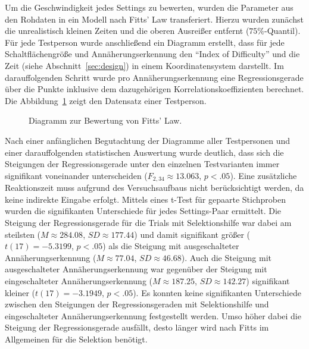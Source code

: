 \documentclass[12pt,numbers=noenddot,parskip,bibliography=totocnumbered,listof=totocnumbered]{scrreprt}
\begin{document}
Um die Geschwindigkeit jedes Settings zu bewerten, wurden die Parameter aus den Rohdaten in ein Modell nach Fitts' Law transferiert. Hierzu wurden zunächst die unrealistisch kleinen Zeiten und die oberen Ausreißer entfernt ($75\%$-Quantil). Für jede Testperson wurde anschließend ein Diagramm erstellt, dass für jede Schaltflächengröße und Annäherungserkennung den "`Index of Difficulty"' und die Zeit (siehe Abschnitt~\ref{sec:design}) in einem Koordinatensystem darstellt. Im darauffolgenden Schritt wurde pro Annäherungserkennung eine Regressionsgerade über die Punkte inklusive dem dazugehörigen Korrelationskoeffizienten berechnet. Die Abbildung~\ref{ergebnistest2fitts} zeigt den Datensatz einer Testperson.
\begin{figure}
\centering
\caption{Diagramm zur Bewertung von Fitts' Law.}
\label{ergebnistest2fitts}
\end{figure}
Nach einer anfänglichen Begutachtung der Diagramme aller Testpersonen und einer darauffolgenden statistischen Auswertung wurde deutlich, dass sich die Steigungen der Regressionsgerade unter den einzelnen Testvarianten immer signifikant voneinander unterscheiden ($F_{2,34}\approx 13.063$, $p < .05$). Eine zusätzliche Reaktionszeit muss aufgrund des Versuchsaufbaus nicht berücksichtigt werden, da keine indirekte Eingabe erfolgt. Mittels eines t-Test für gepaarte Stichproben wurden die signifikanten Unterschiede für jedes Settings-Paar ermittelt. Die Steigung der Regressionsgerade für die Trials mit Selektionshilfe war dabei am steilsten ($M \approx 284.08$, $SD \approx 177.44$) und damit signifikant größer ($t(17) = -5.3199$, $p < .05$) als die Steigung mit ausgeschalteter Annäherungserkennung ($M \approx 77.04$, $SD \approx 46.68$). Auch die Steigung mit ausgeschalteter Annäherungserkennung war gegenüber der Steigung mit eingeschalteter Annäherungserkennung ($M \approx 187.25$, $SD \approx 142.27$) signifikant kleiner ($t(17) = -3.1949$, $p < .05$). Es konnten keine signifikanten Unterschiede zwischen den Steigungen der Regressionsgeraden mit Selektionshilfe und eingeschalteter Annäherungserkennung festgestellt werden. Umso höher dabei die Steigung der Regressionsgerade ausfällt, desto länger wird nach Fitts im Allgemeinen für die Selektion benötigt.
\end{document}
